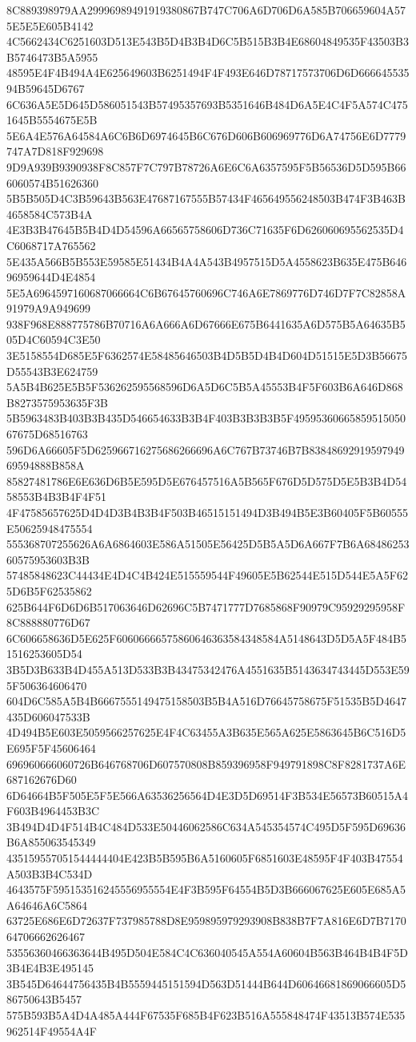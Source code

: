 {{{{{{{{{{{{{{{{{{{{{8C889398979AA29996989491919380867B747C706A6D706D6A585B706659604A575E5E5E605B4142
4C5662434C6251603D513E543B5D4B3B4D6C5B515B3B4E68604849535F43503B3B5746473B5A5955
48595E4F4B494A4E625649603B6251494F4F493E646D78717573706D6D66664553594B59645D6767
6C636A5E5D645D586051543B57495357693B5351646B484D6A5E4C4F5A574C4751645B5554675E5B
5E6A4E576A64584A6C6B6D6974645B6C676D606B606969776D6A74756E6D7779747A7D818F929698
9D9A939B9390938F8C857F7C797B78726A6E6C6A6357595F5B56536D5D595B666060574B51626360
5B5B505D4C3B59643B563E47687167555B57434F465649556248503B474F3B463B4658584C573B4A
4E3B3B47645B5B4D4D54596A66565758606D736C71635F6D626060695562535D4C6068717A765562
5E435A566B5B553E59585E51434B4A4A543B4957515D5A4558623B635E475B64696959644D4E4854
5E5A6964597160687066664C6B67645760696C746A6E7869776D746D7F7C82858A91979A9A949699
938F968E888775786B70716A6A666A6D67666E675B6441635A6D575B5A64635B505D4C60594C3E50
3E5158554D685E5F6362574E58485646503B4D5B5D4B4D604D51515E5D3B56675D55543B3E624759
5A5B4B625E5B5F536262595568596D6A5D6C5B5A45553B4F5F603B6A646D868B8273575953635F3B
5B5963483B403B3B435D546654633B3B4F403B3B3B3B5F4959536066585951505067675D68516763
596D6A66605F5D625966716275686266696A6C767B73746B7B8384869291959794969594888B858A
85827481786E6E636D6B5E595D5E676457516A5B565F676D5D575D5E5B3B4D5458553B4B3B4F4F51
4F47585657625D4D4D3B4B3B4F503B46515151494D3B494B5E3B60405F5B60555E50625948475554
555368707255626A6A6864603E586A51505E56425D5B5A5D6A667F7B6A6848625360575953603B3B
57485848623C44434E4D4C4B424E515559544F49605E5B62544E515D544E5A5F625D6B5F62535862
625B644F6D6D6B517063646D62696C5B7471777D7685868F90979C95929295958F8C888880776D67
6C606658636D5E625F60606666575860646363584348584A5148643D5D5A5F484B51516253605D54
3B5D3B633B4D455A513D533B3B43475342476A4551635B5143634743445D553E595F506364606470
604D6C585A5B4B6667555149475158503B5B4A516D76645758675F51535B5D4647435D606047533B
4D494B5E603E5059566257625E4F4C63455A3B635E565A625E5863645B6C516D5E695F5F45606464
696960666060726B646768706D607570808B859396958F949791898C8F8281737A6E687162676D60
6D64664B5F505E5F5E566A63536256564D4E3D5D69514F3B534E56573B60515A4F603B4964453B3C
3B494D4D4F514B4C484D533E50446062586C634A545354574C495D5F595D69636B6A855063545349
435159557051544444404E423B5B595B6A5160605F6851603E48595F4F403B47554A503B3B4C534D
4643575F595153516245556955554E4F3B595F64554B5D3B666067625E605E685A5A64646A6C5864
63725E686E6D72637F737985788D8E959895979293908B838B7F7A816E6D7B717064706662626467
53556360466363644B495D504E584C4C636040545A554A60604B563B464B4B4F5D3B4E4B3E495145
3B545D64644756435B4B5559445151594D563D51444B644D60646681869066605D586750643B5457
575B593B5A4D4A485A444F67535F685B4F623B516A555848474F43513B574E535962514F49554A4F
}}}}}}}}}}}}}}}}}}}}}
